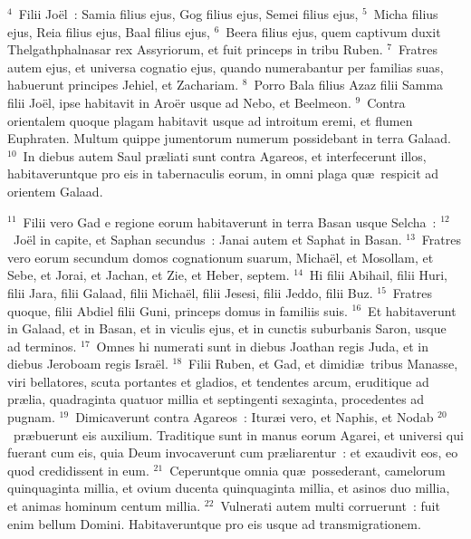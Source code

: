 ${}^{4}$~Filii Jo\"el~: Samia filius ejus, Gog filius ejus, Semei filius ejus,
${}^{5}$~Micha filius ejus, Reia filius ejus, Baal filius ejus,
${}^{6}$~Beera filius ejus, quem captivum duxit Thelgathphalnasar rex Assyriorum, et fuit princeps in tribu Ruben.
${}^{7}$~Fratres autem ejus, et universa cognatio ejus, quando numerabantur per familias suas, habuerunt principes Jehiel, et Zachariam.
${}^{8}$~Porro Bala filius Azaz filii Samma filii Jo\"el, ipse habitavit in Aro\"er usque ad Nebo, et Beelmeon.
${}^{9}$~Contra orientalem quoque plagam habitavit usque ad introitum eremi, et flumen Euphraten. Multum quippe jumentorum numerum possidebant in terra Galaad.
${}^{10}$~In diebus autem Saul pr\ae liati sunt contra Agareos, et interfecerunt illos, habitaveruntque pro eis in tabernaculis eorum, in omni plaga qu\ae\ respicit ad orientem Galaad.


${}^{11}$~Filii vero Gad e regione eorum habitaverunt in terra Basan usque Selcha~:
${}^{12}$~Jo\"el in capite, et Saphan secundus~: Janai autem et Saphat in Basan.
${}^{13}$~Fratres vero eorum secundum domos cognationum suarum, Micha\"el, et Mosollam, et Sebe, et Jorai, et Jachan, et Zie, et Heber, septem.
${}^{14}$~Hi filii Abihail, filii Huri, filii Jara, filii Galaad, filii Micha\"el, filii Jesesi, filii Jeddo, filii Buz.
${}^{15}$~Fratres quoque, filii Abdiel filii Guni, princeps domus in familiis suis.
${}^{16}$~Et habitaverunt in Galaad, et in Basan, et in viculis ejus, et in cunctis suburbanis Saron, usque ad terminos.
${}^{17}$~Omnes hi numerati sunt in diebus Joathan regis Juda, et in diebus Jeroboam regis Isra\"el.
${}^{18}$~Filii Ruben, et Gad, et dimidi\ae\ tribus Manasse, viri bellatores, scuta portantes et gladios, et tendentes arcum, eruditique ad pr\ae lia, quadraginta quatuor millia et septingenti sexaginta, procedentes ad pugnam.
${}^{19}$~Dimicaverunt contra Agareos~: Itur\ae i vero, et Naphis, et Nodab
${}^{20}$~pr\ae buerunt eis auxilium. Traditique sunt in manus eorum Agarei, et universi qui fuerant cum eis, quia Deum invocaverunt cum pr\ae liarentur~: et exaudivit eos, eo quod credidissent in eum.
${}^{21}$~Ceperuntque omnia qu\ae\ possederant, camelorum quinquaginta millia, et ovium ducenta quinquaginta millia, et asinos duo millia, et animas hominum centum millia.
${}^{22}$~Vulnerati autem multi corruerunt~: fuit enim bellum Domini. Habitaveruntque pro eis usque ad transmigrationem.


